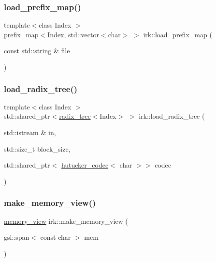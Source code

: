 \mbox{\label{namespaceirk_a42d3931cb977799b449703e53b5b893f}} 
\subsubsection{\texorpdfstring{load\+\_\+prefix\+\_\+map()}{load\_prefix\_map()}\hspace{0.1cm}{\footnotesize\ttfamily [3/3]}}
{\footnotesize\ttfamily template$<$class Index $>$ \\
\mbox{\hyperlink{classirk_1_1prefix__map}{prefix\+\_\+map}}$<$Index, std\+::vector$<$char$>$ $>$ irk\+::load\+\_\+prefix\+\_\+map (\begin{DoxyParamCaption}\item[{const std\+::string \&}]{file }\end{DoxyParamCaption})}

\mbox{\label{namespaceirk_a11724f6a30a7fb17f24d0941fa00568d}} 
\subsubsection{\texorpdfstring{load\+\_\+radix\+\_\+tree()}{load\_radix\_tree()}}
{\footnotesize\ttfamily template$<$class Index $>$ \\
std\+::shared\+\_\+ptr$<$\mbox{\hyperlink{classirk_1_1radix__tree}{radix\+\_\+tree}}$<$Index$>$ $>$ irk\+::load\+\_\+radix\+\_\+tree (\begin{DoxyParamCaption}\item[{std\+::istream \&}]{in,  }\item[{std\+::size\+\_\+t}]{block\+\_\+size,  }\item[{std\+::shared\+\_\+ptr$<$ \mbox{\hyperlink{classirk_1_1hutucker__codec}{hutucker\+\_\+codec}}$<$ char $>$$>$}]{codec }\end{DoxyParamCaption})}

\mbox{\label{namespaceirk_ac123106f771ea0ef0ee855f8ee98bc2b}} 
\subsubsection{\texorpdfstring{make\+\_\+memory\+\_\+view()}{make\_memory\_view()}\hspace{0.1cm}{\footnotesize\ttfamily [1/2]}}
{\footnotesize\ttfamily \mbox{\hyperlink{classirk_1_1memory__view}{memory\+\_\+view}} irk\+::make\+\_\+memory\+\_\+view (\begin{DoxyParamCaption}\item[{gsl\+::span$<$ const char $>$}]{mem }\end{DoxyParamCaption})}

